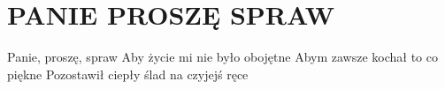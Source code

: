 \documentclass[../../../songbook.tex]{subfiles}
\begin{document}
\TabPositions{8cm} %
\section*{PANIE PROSZĘ SPRAW}
{}
\vspace{0.5cm}
Panie, proszę, spraw						 \newline
Aby życie mi nie było obojętne				 \newline
Abym zawsze kochał to co piękne				 \newline
Pozostawił ciepły ślad na czyjejś ręce		 \newline
\end{document}
